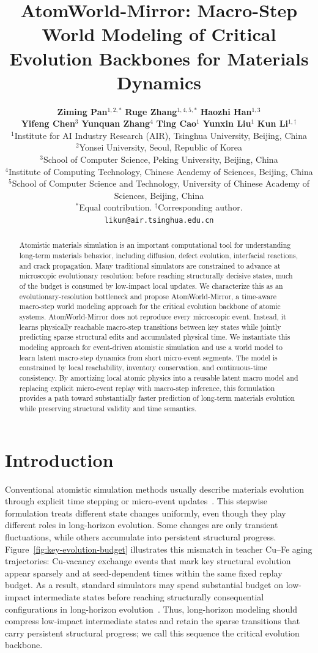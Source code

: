 \documentclass{article}
\title{AtomWorld-Mirror: Macro-Step World Modeling of Critical Evolution Backbones for Materials Dynamics}
\author{%
  \normalfont
  \textbf{Ziming Pan}$^{1,2,*}$ \quad
  \textbf{Ruge Zhang}$^{1,4,5,*}$ \quad
  \textbf{Haozhi Han}$^{1,3}$ \\
  \textbf{Yifeng Chen}$^{3}$ \quad
  \textbf{Yunquan Zhang}$^{4}$ \quad
  \textbf{Ting Cao}$^{1}$ \quad
  \textbf{Yunxin Liu}$^{1}$ \quad
  \textbf{Kun Li}$^{1,\dagger}$ \\
  {\small $^1$Institute for AI Industry Research (AIR), Tsinghua University, Beijing, China}\\
  {\small $^2$Yonsei University, Seoul, Republic of Korea}\\
  {\small $^3$School of Computer Science, Peking University, Beijing, China}\\
  {\small $^4$Institute of Computing Technology, Chinese Academy of Sciences, Beijing, China}\\
  {\small $^5$School of Computer Science and Technology, University of Chinese Academy of Sciences, Beijing, China}\\
  {\small $^*$Equal contribution. \quad $^\dagger$Corresponding author.}\\
  {\small \texttt{likun@air.tsinghua.edu.cn}}
}
\begin{document}
\maketitle

\begin{abstract}
  Atomistic materials simulation is an important computational tool for understanding long-term materials behavior, including diffusion, defect evolution, interfacial reactions, and crack propagation. Many traditional simulators are constrained to advance at microscopic evolutionary resolution: before reaching structurally decisive states, much of the budget is consumed by low-impact local updates. We characterize this as an evolutionary-resolution bottleneck and propose AtomWorld-Mirror, a time-aware macro-step world modeling approach for the critical evolution backbone of atomic systems. AtomWorld-Mirror does not reproduce every microscopic event. Instead, it learns physically reachable macro-step transitions between key states while jointly predicting sparse structural edits and accumulated physical time. We instantiate this modeling approach for event-driven atomistic simulation and use a world model to learn latent macro-step dynamics from short micro-event segments. The model is constrained by local reachability, inventory conservation, and continuous-time consistency. By amortizing local atomic physics into a reusable latent macro model and replacing explicit micro-event replay with macro-step inference, this formulation provides a path toward substantially faster prediction of long-term materials evolution while preserving structural validity and time semantics.
\end{abstract}

\section{Introduction}

Conventional atomistic simulation methods usually describe materials evolution through explicit time stepping or micro-event updates~\cite{alder1959md,verlet1967fluids,bortz1975nfold,gillespie1976general,fichthorn1991dmc}. This stepwise formulation treats different state changes uniformly, even though they play different roles in long-horizon evolution. Some changes are only transient fluctuations, while others accumulate into persistent structural progress. Figure~\ref{fig:key-evolution-budget} illustrates this mismatch in teacher Cu--Fe aging trajectories: Cu-vacancy exchange events that mark key structural evolution appear sparsely and at seed-dependent times within the same fixed replay budget. As a result, standard simulators may spend substantial budget on low-impact intermediate states before reaching structurally consequential configurations in long-horizon evolution~\cite{voter2002timescale,henkelman2000neb,laio2002metadynamics,bolhuis2002tps,soisson1996cufe,soisson2007cufe}. Thus, long-horizon modeling should compress low-impact intermediate states and retain the sparse transitions that carry persistent structural progress; we call this sequence the critical evolution backbone.
\end{document}
